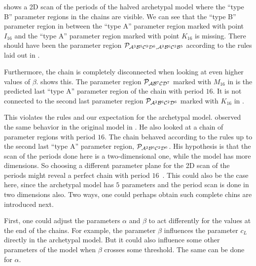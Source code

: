  shows a 2D scan of the periods of the halved archetypal model where the ``type B'' parameter regions in the chains are visible.
We can see that the ``type B'' parameter region in  between the ``type A'' parameter region marked with point $I_{16}$ and the ``type A'' parameter region marked with point $K_{16}$ is missing.
There should have been the parameter region $\mathcal{P}_{\mathcal{A}^3\mathcal{B}^5\mathcal{C}^2\mathcal{D}^6, \mathcal{A}^2\mathcal{B}^6\mathcal{C}^3\mathcal{B}^5}$ according to the rules laid out in .

Furthermore, the chain is completely disconnected when looking at even higher values of $\beta$.
 shows this.
The parameter region $\mathcal{P}_{\mathcal{A}\mathcal{B}^7\mathcal{C}\mathcal{D}^7}$ marked with $M_{16}$ in  is the predicted last ``type A'' parameter region of the chain with period $16$.
It is not connected to the second last parameter region $\mathcal{P}_{\mathcal{A}^2\mathcal{B}^6\mathcal{C}^2\mathcal{D}^6}$ marked with $K_{16}$ in .

This violates the rules and our expectation for the archetypal model.
 observed the same behavior in the original model in \cite{akyuz2022}.
He also looked at a chain of parameter regions with period $16$.
The chain behaved according to the rules up to the second last ``type A'' parameter region, $\mathcal{P}_{\mathcal{A}^2\mathcal{B}^6\mathcal{C}^2\mathcal{D}^6}$.
His hypothesis is that the scan of the periods done here is a two-dimensional one, while the model has more dimensions.
So choosing a different parameter plane for the 2D scan of the periods might reveal a perfect chain with period $16$~\cite{akyuz2022}.
This could also be the case here, since the archetypal model has $5$ parameters and the period scan is done in two dimensions also.
Two ways, one could perhaps obtain such complete chins are introduced next.

First, one could adjust the parameters $\alpha$ and $\beta$ to act differently for the values at the end of the chains.
For example, the parameter $\beta$ influences the parameter $c_L$ directly in the archetypal model.
But it could also influence some other parameters of the model when $\beta$ crosses some threshold.
The same can be done for $\alpha$.

